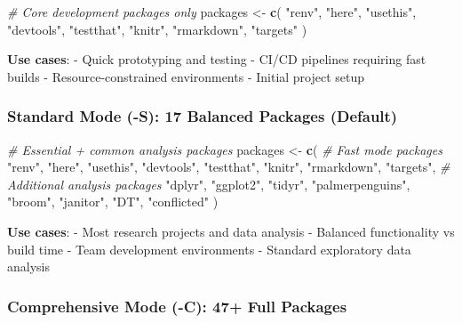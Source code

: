 \documentclass[
]{article}
\newenvironment{Shaded}{\begin{snugshade}}{\end{snugshade}}
\newcommand{\CommentTok}[1]{\textcolor[rgb]{0.56,0.35,0.01}{\textit{#1}}}
\newcommand{\FunctionTok}[1]{\textcolor[rgb]{0.13,0.29,0.53}{\textbf{#1}}}
\newcommand{\NormalTok}[1]{#1}
\newcommand{\OtherTok}[1]{\textcolor[rgb]{0.56,0.35,0.01}{#1}}
\newcommand{\StringTok}[1]{\textcolor[rgb]{0.31,0.60,0.02}{#1}}
\begin{document}
\begin{Shaded}
\begin{Highlighting}[]
\CommentTok{\# Core development packages only}
\NormalTok{packages }\OtherTok{\textless{}{-}} \FunctionTok{c}\NormalTok{(}
  \StringTok{"renv"}\NormalTok{, }\StringTok{"here"}\NormalTok{, }\StringTok{"usethis"}\NormalTok{, }\StringTok{"devtools"}\NormalTok{,}
  \StringTok{"testthat"}\NormalTok{, }\StringTok{"knitr"}\NormalTok{, }\StringTok{"rmarkdown"}\NormalTok{, }\StringTok{"targets"}
\NormalTok{)}
\end{Highlighting}
\end{Shaded}

\textbf{Use cases}: - Quick prototyping and testing - CI/CD pipelines
requiring fast builds - Resource-constrained environments - Initial
project setup

\subsubsection{Standard Mode (-S): 17 Balanced Packages
(Default)}\label{standard-mode--s-17-balanced-packages-default}

\begin{Shaded}
\begin{Highlighting}[]
\CommentTok{\# Essential + common analysis packages}
\NormalTok{packages }\OtherTok{\textless{}{-}} \FunctionTok{c}\NormalTok{(}
  \CommentTok{\# Fast mode packages}
  \StringTok{"renv"}\NormalTok{, }\StringTok{"here"}\NormalTok{, }\StringTok{"usethis"}\NormalTok{, }\StringTok{"devtools"}\NormalTok{, }\StringTok{"testthat"}\NormalTok{,}
  \StringTok{"knitr"}\NormalTok{, }\StringTok{"rmarkdown"}\NormalTok{, }\StringTok{"targets"}\NormalTok{,}
  \CommentTok{\# Additional analysis packages}
  \StringTok{"dplyr"}\NormalTok{, }\StringTok{"ggplot2"}\NormalTok{, }\StringTok{"tidyr"}\NormalTok{, }\StringTok{"palmerpenguins"}\NormalTok{,}
  \StringTok{"broom"}\NormalTok{, }\StringTok{"janitor"}\NormalTok{, }\StringTok{"DT"}\NormalTok{, }\StringTok{"conflicted"}
\NormalTok{)}
\end{Highlighting}
\end{Shaded}

\textbf{Use cases}: - Most research projects and data analysis -
Balanced functionality vs build time - Team development environments -
Standard exploratory data analysis

\subsubsection{Comprehensive Mode (-C): 47+ Full
Packages}\label{comprehensive-mode--c-47-full-packages}
\end{document}
